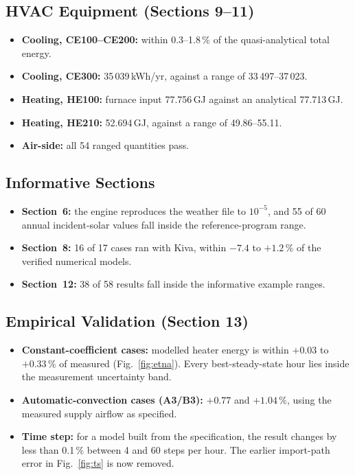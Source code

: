 \documentclass[conference,10pt]{IEEEtran}
\begin{document}
\subsection{HVAC Equipment (Sections 9--11)}
\begin{itemize}
\item \textbf{Cooling, CE100--CE200:} within 0.3--1.8\,\% of the quasi-analytical total energy.
\item \textbf{Cooling, CE300:} 35\,039\,kWh/yr, against a range of 33\,497--37\,023.
\item \textbf{Heating, HE100:} furnace input 77.756\,GJ against an analytical 77.713\,GJ.
\item \textbf{Heating, HE210:} 52.694\,GJ, against a range of 49.86--55.11.
\item \textbf{Air-side:} all 54 ranged quantities pass.
\end{itemize}

\subsection{Informative Sections}
\begin{itemize}
\item \textbf{Section~6:} the engine reproduces the weather file to $10^{-5}$, and 55 of 60 annual incident-solar
values fall inside the reference-program range.
\item \textbf{Section~8:} 16 of 17 cases ran with Kiva, within $-7.4$ to $+1.2$\,\% of the verified numerical
models.
\item \textbf{Section~12:} 38 of 58 results fall inside the informative example ranges.
\end{itemize}

\subsection{Empirical Validation (Section 13)}
\begin{itemize}
\item \textbf{Constant-coefficient cases:} modelled heater energy is within $+0.03$ to $+0.33$\,\% of measured
(Fig.~\ref{fig:etna}). Every best-steady-state hour lies inside the measurement uncertainty band.
\item \textbf{Automatic-convection cases (A3/B3):} $+0.77$ and $+1.04$\,\%, using the measured supply airflow as
specified.
\item \textbf{Time step:} for a model built from the specification, the result changes by less than 0.1\,\% between
4 and 60 steps per hour. The earlier import-path error in Fig.~\ref{fig:ts} is now removed.
\end{itemize}
\end{document}
